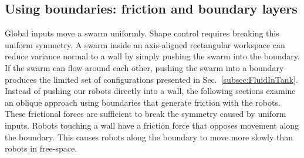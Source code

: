 \subsection{Using boundaries: friction and boundary layers}\label{subsec:WallFriction}
Global inputs move a swarm uniformly.  
Shape control requires breaking this uniform symmetry.  
A swarm inside an axis-aligned rectangular workspace can reduce variance normal to a wall by simply pushing the swarm into the boundary. 
If the swarm can flow around each other, pushing the swarm into a boundary produces the limited set of configurations presented in Sec.~\ref{subsec:FluidInTank}.
Instead of pushing our robots directly into a wall, the following sections examine an oblique approach  using boundaries that generate friction with the robots. 
 These frictional forces are  sufficient to break the symmetry caused by uniform inputs.  
Robots touching a wall have a friction force that opposes movement along the boundary.  
This causes robots along the boundary to move more slowly than robots in free-space. 
  
